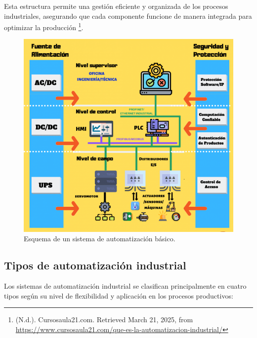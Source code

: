 Esta estructura permite una gestión eficiente y organizada de los procesos industriales, asegurando que cada componente funcione de manera integrada para optimizar la producción  \footnote{(N.d.). Cursosaula21.com. Retrieved March 21, 2025, from \url{https://www.cursosaula21.com/que-es-la-automatizacion-industrial/}}. 

\begin{figure} [h!]
  \begin{center}
    \includegraphics[width=16cm]{figs/esquema_automatizacion}
  \end{center}
  \caption{\centering Esquema de un sistema de automatización básico.}
  \label{fig:esquema_automatizacion}
\end{figure} 

\subsection{Tipos de automatización industrial}

Los sistemas de automatización industrial se clasifican principalmente en cuatro tipos según su nivel de flexibilidad y aplicación en los procesos productivos:

